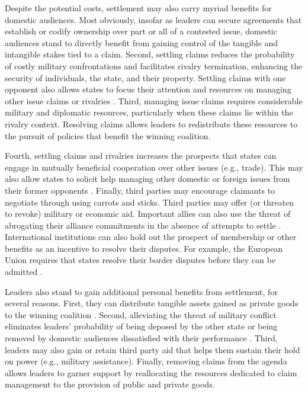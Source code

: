 \documentclass[../../dissertation.tex]{subfiles}
\begin{document}

Despite the potential costs, settlement may also carry myriad benefits for domestic audiences. Most obviously, insofar as leaders can secure agreements that establish or codify ownership over part or all of a contested issue, domestic audiences stand to directly benefit from gaining control of the tangible and intangible stakes tied to a claim. Second, settling claims reduces the probability of costly military confrontations and facilitates rivalry termination, enhancing the security of individuals, the state, and their property. Settling claims with one opponent also allows states to focus their attention and resources on managing other issue claims or rivalries \citep{akcinaroglu2014, fravel2008}. Third, managing issue claims requires considerable military and diplomatic resources, particularly when these claims lie within the rivalry context. Resolving claims allows leaders to redistribute these resources to the pursuit of policies that benefit the winning coalition. 

Fourth, settling claims and rivalries increases the prospects that states can engage in mutually beneficial cooperation over other issues (e.g., trade). This may also allow states to solicit help managing other domestic or foreign issues from their former opponents \citep{fravel2008, goertz2016}. Finally, third parties may encourage claimants to negotiate through using carrots and sticks. Third parties may offer (or threaten to revoke) military or economic aid. Important allies can also use the threat of abrogating their alliance commitments in the absence of attempts to settle \citep{pressman2008}. International institutions can also hold out the prospect of membership or other benefits as an incentive to resolve their disputes. For example, the European Union requires that states resolve their border disputes before they can be admitted \citep{diez2006}.

Leaders also stand to gain additional personal benefits from settlement, for several reasons. First, they can distribute tangible assets gained as private goods to the winning coalition \citep{bdm2003, wright2016}. Second, alleviating the threat of military conflict eliminates leaders’ probability of being deposed by the other state or being removed by domestic audiences dissatisfied with their performance \citep{bdm2003, chiozza2011}. Third, leaders may also gain or retain third party aid that helps them sustain their hold on power (e.g., military assistance). Finally, removing claims from the agenda allows leaders to garner support by reallocating the resources dedicated to claim management to the provision of public and private goods. %
\end{document}
